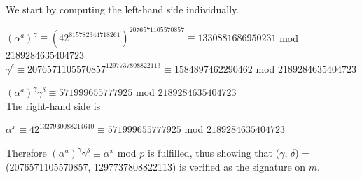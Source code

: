 \documentclass[11pt]{report}
\begin{document}
We start by computing the left-hand side individually.
\begin{center}
$(\alpha^a)^\gamma \equiv (42^{815782344718261})^{2076571105570857} \equiv 1330881686950231$ mod $2189284635404723$\\
$\gamma^\delta \equiv 2076571105570857^{1297737808822113} \equiv 1584897462290462$ mod $2189284635404723$
\end{center}
$(\alpha^a)^\gamma \gamma^\delta \equiv 571999655777925$ mod $2189284635404723$
\\
The right-hand side is
\begin{center}
$\alpha^x \equiv 42^{1327930088214640} \equiv 571999655777925$ mod $2189284635404723$
\end{center}
Therefore $(\alpha^a)^\gamma \gamma^\delta \equiv \alpha^x$ mod $p$ is fulfilled, thus showing that ($\gamma$, $\delta$) = (2076571105570857, 1297737808822113) is verified as the signature on $m$.
\end{document}
